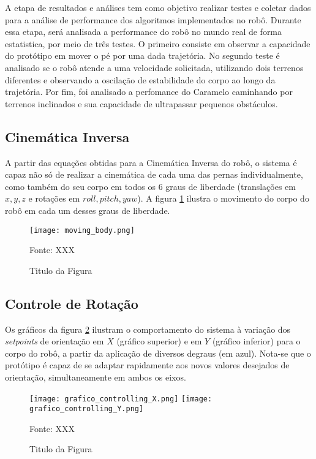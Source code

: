 \documentclass[../main.tex]{subfiles}
\begin{document}
  A etapa de resultados e análises tem como objetivo realizar testes e coletar dados para a análise de performance dos algoritmos implementados no robô. Durante essa etapa, será analisada a performance do robô no mundo real de forma estatistica, por meio de três testes. O primeiro consiste em observar a capacidade do protótipo em mover o pé por uma dada trajetória. No segundo teste é analisado se o robô atende a uma velocidade solicitada, utilizando dois terrenos diferentes e observando a oscilação de estabilidade do corpo ao longo da trajetória. Por fim, foi analisado a perfomance do Caramelo caminhando por terrenos inclinados e sua capacidade de ultrapassar pequenos obstáculos.

  \subsection{Cinemática Inversa}

  A partir das equações obtidas para a Cinemática Inversa do robô, o sistema é capaz não só de realizar a cinemática de cada uma das pernas individualmente, como também do seu corpo em todos os 6 graus de liberdade (translações em $x, y, z$ e rotações em $roll, pitch, yaw$). A figura \ref{fig:moving_body} ilustra o movimento do corpo do robô em cada um desses graus de liberdade.

  \begin{figure}[h]
    \centering
    \caption{Titulo da Figura}
    \texttt{[image: moving\_body.png]}
    
    Fonte: XXX
    \label{fig:moving_body}
  \end{figure}

  \subsection{Controle de Rotação}

  Os gráficos da figura \ref{fig:grafico_controlling} ilustram o comportamento do sistema à variação dos \textit{setpoints} de orientação em $X$ (gráfico superior) e em $Y$ (gráfico inferior) para o corpo do robô, a partir da aplicação de diversos degraus (em azul). Nota-se que o protótipo é capaz de se adaptar rapidamente aos novos valores desejados de orientação, simultaneamente em ambos os eixos.

  \begin{figure}[h]
    \centering
    \caption{Titulo da Figura}
    \texttt{[image: grafico\_controlling\_X.png]}
    \texttt{[image: grafico\_controlling\_Y.png]}
    
    Fonte: XXX
    \label{fig:grafico_controlling}
  \end{figure}
\end{document}
